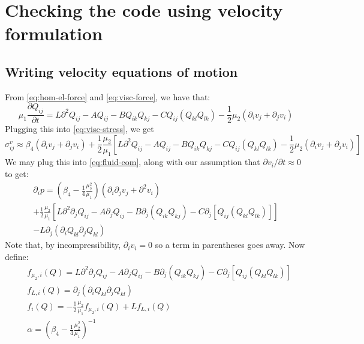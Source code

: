 \documentclass[reqno]{article}
\begin{document}
	\section{Checking the code using velocity formulation}
	\subsection{Writing velocity equations of motion}
	From \eqref{eq:hom-el-force} and \eqref{eq:visc-force}, we have that:
	\begin{equation}
		\mu_1 \frac{\partial Q_{ij}}{\partial t}
		= L\partial^2 Q_{ij} 
		- AQ_{ij} - BQ_{ik}Q_{kj} 
		- C Q_{ij} \left( Q_{kl}Q_{lk} \right) 
		- \frac12 \mu_2 \left(\partial_i v_j + \partial_j v_i\right)
	\end{equation}
	Plugging this into \eqref{eq:visc-stress}, we get
	\begin{equation}
		\sigma^v_{ij} \approx 
		\beta_4 \left(\partial_i v_j + \partial_j v_i\right)
		+ \frac12 \frac{\mu_2}{\mu_1} \left[
		L\partial^2 Q_{ij}
		- A Q_{ij}
		- B Q_{ik} Q_{kj}
		- C Q_{ij} \left( Q_{kl} Q_{lk} \right)
		- \frac12 \mu_2 \left( \partial_i v_j + \partial_j v_i \right)
		\right]
	\end{equation}
	We may plug this into \eqref{eq:fluid-eom}, along with our assumption that $\partial v_i/\partial t \approx 0$ to get:
	\begin{multline}
		\partial_i p = 
		\left( \beta_4 - \frac14 \frac{\mu_2^2}{\mu_1} \right)
		\left( \partial_i \partial_j v_j + \partial^2 v_i \right) \\
		+ \frac12 \frac{\mu_2}{\mu_1}
		\left[
		L \partial^2 \partial_j Q_{ij} 
		- A \partial_j Q_{ij}
		- B \partial_j \left( Q_{ik} Q_{kj} \right)
		- C\partial_j \left[ Q_{ij} \left( Q_{kl} Q_{lk} \right) \right]
		\right]\\
		- L\partial_j \left( \partial_i Q_{kl} \partial_j Q_{kl} \right)
	\end{multline}
	Note that, by incompressibility, $\partial_i v_i = 0$ so a term in parentheses goes away. Now define:
	\begin{align}
		&f_{\mu_2, i}(Q) = 
		L \partial^2 \partial_j Q_{ij} 
		- A \partial_j Q_{ij}
		- B \partial_j \left( Q_{ik} Q_{kj} \right)
		- C\partial_j \left[ Q_{ij} \left( Q_{kl} Q_{lk} \right) \right] \\
		&f_{L, i} (Q) = \partial_j \left( \partial_i Q_{kl} \partial_j Q_{kl} \right) \\
		&f_i (Q) = -\frac12 \frac{\mu_2}{\mu_1} f_{\mu_2, i} (Q) + L f_{L, i} (Q) \\
		&\alpha = \left( \beta_4 - \frac14 \frac{\mu_2^2}{\mu_1} \right)^{-1}
	\end{align}
\end{document}
